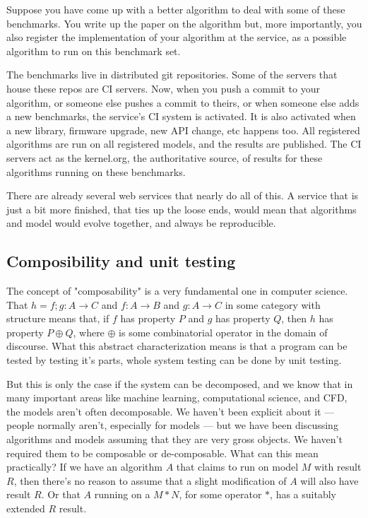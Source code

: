 \documentclass[conference]{IEEEtran}
\begin{document}
Suppose you have come up with a better algorithm to deal with some of
these benchmarks. You write up the paper on the algorithm but, more
importantly, you also register the implementation of your algorithm at
the service, as a possible algorithm to run on this benchmark set.

The benchmarks live in distributed git repositories. Some of the
servers that house these repos are CI servers. Now, when you push a
commit to your algorithm, or someone else pushes a commit to theirs,
or when someone else adds a new benchmarks, the service's CI system is
activated. It is also activated when a new library, firmware upgrade,
new API change, etc happens too. All registered algorithms are run on
all registered models, and the results are published. The CI servers
act as the kernel.org, the authoritative source, of results for these
algorithms running on these benchmarks.

There are already several web services that nearly do all of this. A
service that is just a bit more finished, that ties up the loose ends,
would mean that algorithms and model would evolve together, and always
be reproducible.

\subsection{Composibility and unit testing}


The concept of "composability" is a very fundamental one in computer science. 
That $h = f;g : A \rightarrow C$ and $f : A \rightarrow B$ and $g : A \rightarrow C$ 
in some category with structure means that, if $f$ has property $P$ and $g$ has
property $Q$, then $h$ has property $P \oplus Q$, where $\oplus$ is some 
combinatorial operator in the domain of discourse. What this abstract 
characterization means is that a program can be tested by testing it's parts,
whole system testing can be done by unit testing. 

But this is only the case if the system can be decomposed, and we know that in
many important areas like machine learning, computational science, and CFD,
the models aren't often decomposable.  We haven't been explicit about it ---
people normally aren't, especially for models ---  but we have been discussing
algorithms and models assuming that they are very gross objects. We haven't
required them to be composable or de-composable. What can this mean
practically? If we have an algorithm $A$ that claims to run on model $M$ with
result $R$, then there's no reason to assume that a slight modification of $A$
will also have result $R$. Or that $A$ running on a $M * N$, for some operator
$*$, has a suitably extended $R$ result.
\end{document}
